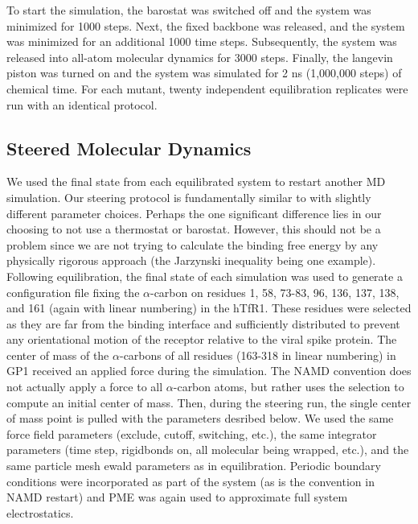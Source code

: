 \documentclass[12pt]{article}
\begin{document}
To start the simulation, the barostat was switched off and the system was minimized for 1000 steps. Next, the fixed backbone was released, and the system was minimized for an additional 1000 time steps. Subsequently, the system was released into all-atom molecular dynamics for 3000 steps. Finally, the langevin piston was turned on and the system was simulated for 2 ns (1,000,000 steps) of chemical time. For each mutant, twenty independent equilibration replicates were run with an identical protocol.

\subsection{Steered Molecular Dynamics}

We used the final state from each equilibrated system to restart another MD simulation. Our steering protocol is fundamentally similar to \citet{Cuendet2008} with slightly different parameter choices. Perhaps the one significant difference lies in our choosing to not use a thermostat or barostat. However, this should not be a problem since we are not trying to calculate the binding free energy by any physically rigorous approach (the Jarzynski inequality being one example). Following equilibration, the final state of each simulation was used to generate a configuration file fixing the $\alpha$-carbon on residues 1, 58, 73-83, 96, 136, 137, 138, and 161 (again with linear numbering) in the hTfR1. These residues were selected as they are far from the binding interface and sufficiently distributed to prevent any orientational motion of the receptor relative to the viral spike protein. The center of mass of the $\alpha$-carbons of all residues (163-318 in linear numbering) in GP1 received an applied force during the simulation. The NAMD convention does not actually apply a force to all $\alpha$-carbon atoms, but rather uses the selection to compute an initial center of mass. Then, during the steering run, the single center of mass point is pulled with the parameters desribed below. We used the same force field parameters (exclude, cutoff, switching, etc.), the same integrator parameters (time step, rigidbonds on, all molecular being wrapped, etc.), and the same particle mesh ewald parameters as in equilibration. Periodic boundary conditions were incorporated as part of the system (as is the convention in NAMD restart) and PME was again used to approximate full system electrostatics. 
\end{document}
